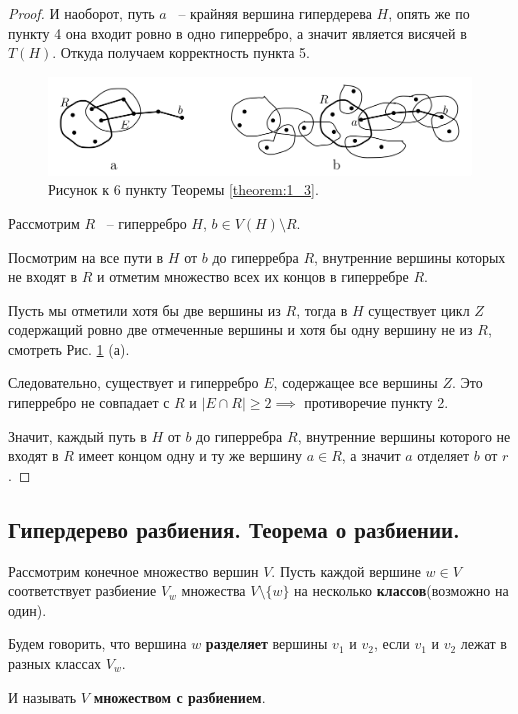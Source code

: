 \begin{proof}
	И наоборот, путь $a$ ~-- крайняя вершина гипердерева $H$, опять же по пункту 4 она входит ровно в одно гиперребро, а значит является висячей в $T(H)$.
	Откуда получаем корректность пункта 5.

\begin{figure}[ht]
    \centering
	\includegraphics[width=0.6\columnwidth]{figures/theorem_1_3.png}
	\caption{Рисунок к 6 пункту Теоремы \ref{theorem:1_3}.}
    \label{fig:theorem_1_3}
\end{figure}

	Рассмотрим $R$ ~-- гиперребро $H$, $b \in V(H) \setminus R$.

	Посмотрим на все пути в $H$ от $b$ до гиперребра $R$, внутренние вершины которых не входят в $R$ и отметим множество всех их концов в гиперребре $R$.

	Пусть мы отметили хотя бы две вершины из  $R$, тогда в $H$ существует цикл $Z$ содержащий ровно две отмеченные вершины и хотя бы одну вершину не из $R$, смотреть Рис. \ref{fig:theorem_1_3} (а).

	Следовательно, существует и гиперребро $E$, содержащее все вершины $Z$.
	Это гиперребро не совпадает с  $R$ и  $|E \cap R| \geqslant 2 \implies $ противоречие пункту 2.

	Значит, каждый путь в  $H$ от $b$ до гиперребра $R$, внутренние вершины которого не входят в $R$ имеет концом одну и ту же вершину $a \in R$, а значит  $a$ отделяет $b$ от  $r$.
 \end{proof}

\subsection{Гипердерево разбиения. Теорема о разбиении.}

\begin{df*}
	Рассмотрим конечное множество вершин $V$. Пусть каждой вершине $w \in V$ соответствует разбиение $V_w$ множества $V \setminus \{w\}$ на несколько \textbf{классов}(возможно на один).

	Будем говорить, что вершина $w$ \textbf{разделяет} вершины $v_1$ и $v_2$, если $v_1$ и $v_2$ лежат в разных классах $V_w$.

	И называть  $V$ \textbf{множеством с разбиением}.
\end{df*}

